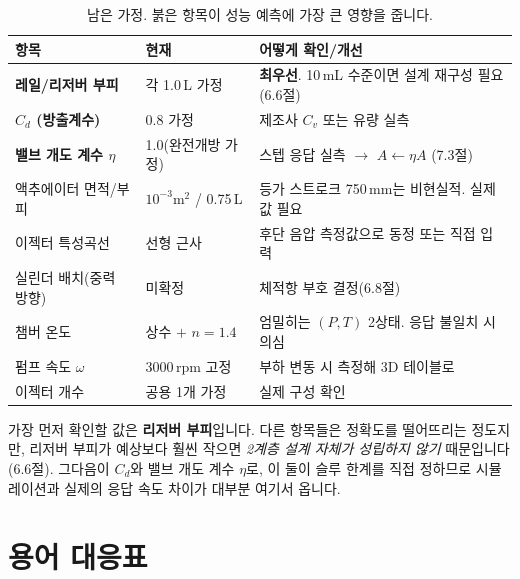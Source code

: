 \documentclass[11pt]{article}
\begin{document}
\begin{table}[h]
\centering\small
\begin{tabular}{@{}p{3.6cm}p{4.6cm}p{6.0cm}@{}}
\toprule
\textbf{항목} & \textbf{현재} & \textbf{어떻게 확인/개선} \\
\midrule
\rowcolor{red!8}
\textbf{레일/리저버 부피} & 각 1.0\,L 가정 & \textbf{최우선}. 10\,mL 수준이면 설계 재구성 필요(6.6절) \\
\rowcolor{red!8}
\textbf{$C_d$ (방출계수)} & 0.8 가정 & 제조사 $C_v$ 또는 유량 실측 \\
\rowcolor{red!8}
\textbf{밸브 개도 계수 $\eta$} & 1.0(완전개방 가정) & 스텝 응답 실측 $\to$ $A\leftarrow\eta A$ (7.3절) \\
액추에이터 면적/부피 & $10^{-3}$m$^2$ / 0.75\,L & 등가 스트로크 750\,mm는 비현실적. 실제값 필요 \\
이젝터 특성곡선 & 선형 근사 & 후단 음압 측정값으로 동정 또는 직접 입력 \\
실린더 배치(중력 방향) & 미확정 & 체적항 부호 결정(6.8절) \\
챔버 온도 & 상수 $+$ $n{=}1.4$ & 엄밀히는 $(P,T)$ 2상태. 응답 불일치 시 의심 \\
펌프 속도 $\omega$ & 3000\,rpm 고정 & 부하 변동 시 측정해 3D 테이블로 \\
이젝터 개수 & 공용 1개 가정 & 실제 구성 확인 \\
\bottomrule
\end{tabular}
\caption{남은 가정. 붉은 항목이 성능 예측에 가장 큰 영향을 줍니다.}
\end{table}

\begin{keybox}
가장 먼저 확인할 값은 \textbf{리저버 부피}입니다. 다른 항목들은 정확도를 떨어뜨리는
정도지만, 리저버 부피가 예상보다 훨씬 작으면 \emph{2계층 설계 자체가 성립하지 않기}
때문입니다(6.6절). 그다음이 $C_d$와 밸브 개도 계수 $\eta$로, 이 둘이 슬루 한계를 직접
정하므로 시뮬레이션과 실제의 응답 속도 차이가 대부분 여기서 옵니다.
\end{keybox}

\section{용어 대응표}
\end{document}
